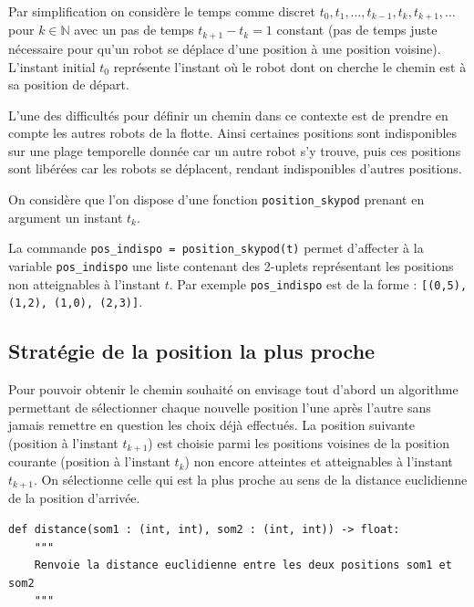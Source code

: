Par simplification on considère le temps comme discret $t_0, t_1, \ldots, t_{k-1}, t_k, t_{k+1}, \ldots$ pour $k \in \mathbb{N}$ avec un pas de temps $t_{k+1} - t_k = 1$ constant (pas de temps juste nécessaire pour qu'un robot se déplace d'une position à une position voisine). L'instant initial $t_0$ représente l'instant où le robot dont on cherche le chemin est à sa position de départ.

L'une des difficultés pour définir un chemin dans ce contexte est de prendre en compte les autres robots de la flotte. Ainsi certaines positions sont indisponibles sur une plage temporelle donnée car un autre robot s'y trouve, puis ces positions sont libérées car les robots se déplacent, rendant indisponibles d'autres positions.

On considère que l'on dispose d'une fonction \texttt{position\_skypod} prenant en argument un instant $t_k$.

La commande \texttt{pos\_indispo = position\_skypod(t)} permet d'affecter à la variable \texttt{pos\_indispo} une liste contenant des 2-uplets représentant les positions non atteignables à l'instant $t$. Par exemple \texttt{pos\_indispo} est de la forme : \texttt{[(0,5), (1,2), (1,0), (2,3)]}.

\subsection{Stratégie de la position la plus proche}

Pour pouvoir obtenir le chemin souhaité on envisage tout d'abord un algorithme permettant de sélectionner chaque nouvelle position l'une après l'autre sans jamais remettre en question les choix déjà effectués. La position suivante (position à l'instant $t_{k+1}$) est choisie parmi les positions voisines de la position courante (position à l'instant $t_k$) non encore atteintes et atteignables à l'instant $t_{k+1}$. On sélectionne celle qui est la plus proche au sens de la distance euclidienne de la position d'arrivée.


\begin{lstlisting}
def distance(som1 : (int, int), som2 : (int, int)) -> float:
    """
    Renvoie la distance euclidienne entre les deux positions som1 et som2
    """
\end{lstlisting}

